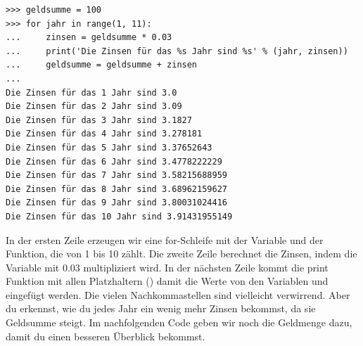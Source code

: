 \begin{Verbatim}[frame=single]
>>> geldsumme = 100
>>> for jahr in range(1, 11):
...     zinsen = geldsumme * 0.03
...     print('Die Zinsen für das %s Jahr sind %s' % (jahr, zinsen))
...     geldsumme = geldsumme + zinsen
...
Die Zinsen für das 1 Jahr sind 3.0
Die Zinsen für das 2 Jahr sind 3.09
Die Zinsen für das 3 Jahr sind 3.1827
Die Zinsen für das 4 Jahr sind 3.278181
Die Zinsen für das 5 Jahr sind 3.37652643
Die Zinsen für das 6 Jahr sind 3.4778222229
Die Zinsen für das 7 Jahr sind 3.58215688959
Die Zinsen für das 8 Jahr sind 3.68962159627
Die Zinsen für das 9 Jahr sind 3.80031024416
Die Zinsen für das 10 Jahr sind 3.91431955149
\end{Verbatim}

In der ersten Zeile erzeugen wir eine for-Schleife mit der  Variable und der  Funktion, die von 1 bis 10 zählt. Die zweite Zeile berechnet die Zinsen, indem die Variable  mit 0.03 multipliziert wird. In der nächsten Zeile kommt die print Funktion mit allen Platzhaltern () damit die Werte von den Variablen  und  eingefügt werden.
Die vielen Nachkommastellen sind vielleicht verwirrend. Aber du erkennst, wie du jedes Jahr ein wenig mehr Zinsen bekommst, da sie Geldsumme steigt.
Im nachfolgenden Code geben wir noch die Geldmenge dazu, damit du einen besseren Überblick bekommst.

